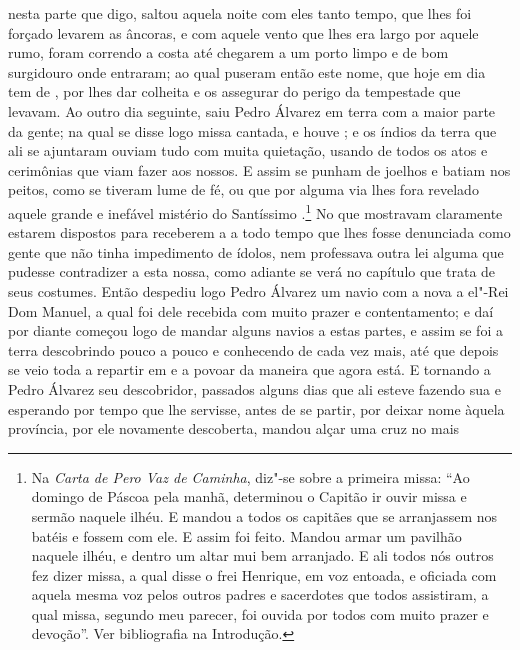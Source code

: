 nesta parte que digo, saltou aquela noite com eles tanto
tempo, que lhes foi forçado levarem as âncoras, e com aquele vento que
lhes era largo por aquele rumo, foram correndo a costa até chegarem a
um porto limpo e de bom surgidouro onde entraram; ao qual puseram então
este nome, que hoje em dia tem de , por lhes dar colheita
e os assegurar do perigo da tempestade que levavam. Ao outro dia
seguinte, saiu Pedro Álvarez em terra com a maior parte da gente; na qual			%
se disse logo missa cantada, e houve ; e os índios 			%
da terra que ali se ajuntaram ouviam tudo com muita quietação, usando de todos os
atos e cerimônias que viam fazer aos nossos. E assim se punham de
joelhos e batiam nos peitos, como se tiveram lume de fé, ou que por
alguma via lhes fora revelado aquele grande e inefável mistério do
Santíssimo .\footnote{ Na \textit{Carta de Pero Vaz de Caminha},
diz"-se sobre a primeira missa: ``Ao domingo de Páscoa
pela manhã, determinou o Capitão ir ouvir missa e sermão naquele ilhéu.
E mandou a todos os capitães que se arranjassem nos batéis e fossem com
ele. E assim foi feito. Mandou armar um pavilhão naquele ilhéu, e
dentro um altar mui bem arranjado. E ali todos nós outros fez dizer
missa, a qual disse o frei Henrique, em voz entoada, e oficiada com
aquela mesma voz pelos outros padres e sacerdotes que todos assistiram,
a qual missa, segundo meu parecer, foi ouvida por todos com muito
prazer e devoção''. Ver bibliografia na Introdução.} No que mostravam
claramente estarem dispostos para receberem a  a todo
tempo que lhes fosse denunciada como gente que não tinha impedimento de
ídolos, nem professava outra lei alguma que pudesse contradizer a esta
nossa, como adiante se verá no capítulo que trata de seus costumes.
Então despediu logo Pedro Álvarez um navio com a nova a el"-Rei Dom			%
Manuel, a qual foi dele recebida com muito prazer e contentamento; e			
daí por diante começou logo de mandar alguns navios a estas partes, e
assim se foi a terra descobrindo pouco a pouco e conhecendo de cada vez
mais, até que depois se veio toda a repartir em  e a povoar		%
da maneira que agora está. E tornando a Pedro Álvarez seu descobridor,			%
passados alguns dias que ali esteve fazendo sua  e esperando por
tempo que lhe servisse, antes de se partir, por deixar nome àquela
província, por ele novamente descoberta, mandou alçar uma cruz no mais
